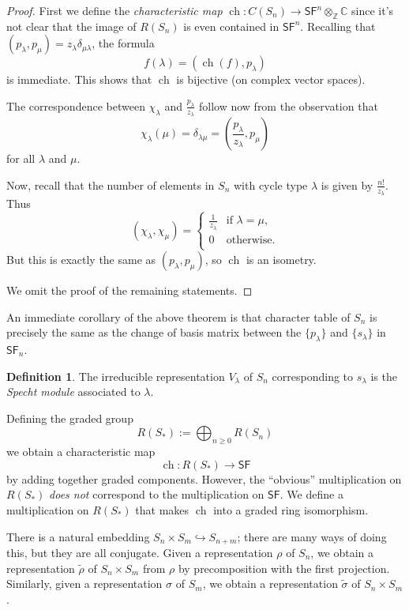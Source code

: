 \documentclass[12pt]{article}
\theoremstyle{plain}
\theoremstyle{definition}
\newtheorem{definition}[theorem]{Definition}
\theoremstyle{remark}
\numberwithin{equation}{section}
\begin{document}
\begin{proof}
First we define the \emph{characteristic map}
$\operatorname{ch} : C(S_n) \to
\mathsf{SF}^n \otimes_{\mathbb{Z}} \mathbb{C}$
since it's not clear that the image of $R(S_n)$ is even
contained in $\mathsf{SF}^n$.
Recalling that $(p_\lambda,p_\mu)=z_\lambda \delta_{\mu \lambda}$,
the formula
\[
f(\lambda) = ( \operatorname{ch}(f), p_\lambda )
\]
is immediate.  This shows that $\operatorname{ch}$ is bijective
(on complex vector spaces).

The correspondence between
$\chi_\lambda$ and $\frac{p_{\lambda}}{z_\lambda}$
follow now from the observation that
\[
\chi_\lambda(\mu) = \delta_{\lambda \mu} =
\left(\frac{p_{\lambda}}{z_\lambda}, p_\mu\right)
\]
for all $\lambda$ and $\mu$.

Now, recall that the number of elements in $S_n$ with cycle type
$\lambda$ is given by $\frac{n!}{z_\lambda}$.  Thus
\[
(\chi_\lambda, \chi_\mu) =
\begin{cases}
\frac{1}{z_\lambda} & \textrm{if $\lambda=\mu$,}\\
0 & \textrm{otherwise.}\\
\end{cases}
\]
But this is exactly the same as $(p_\lambda,p_\mu)$,
so $\operatorname{ch}$ is an isometry.

We omit the proof of the remaining statements. 
\end{proof}

An immediate corollary of the above theorem is that
character table of $S_n$ is precisely the same
as the change of basis matrix between the $\{ p_\lambda \}$
and $\{ s_\lambda \}$ in $\mathsf{SF}_n$.

\begin{definition}
The irreducible representation $V_\lambda$ of $S_n$ corresponding to
$s_\lambda$ is the \emph{Specht module} associated to $\lambda$.
\end{definition}

Defining the graded group
\[
R(S_\ast) := \bigoplus_{n \ge 0} R(S_n)
\]
we obtain a characteristic map
\[
\operatorname{ch} : R(S_\ast) \to \mathsf{SF}
\]
by adding together graded components.
However, the ``obvious'' multiplication on $R(S_\ast)$
\emph{does not} correspond to the multiplication on $\mathsf{SF}$.
We define a multiplication on $R(S_\ast)$ that makes
$\operatorname{ch}$ into a graded ring isomorphism.

There is a natural embedding $S_n \times S_m \hookrightarrow S_{n+m}$;
there are many ways of doing this, but they are all conjugate.
Given a representation $\rho$ of $S_n$, we obtain a representation
$\widetilde{\rho}$ of $S_n \times S_m$ from $\rho$ by precomposition
with the first projection.  Similarly, given a representation $\sigma$
of $S_m$, we obtain a representation $\widetilde{\sigma}$ of
$S_n \times S_m$.
\end{document}
